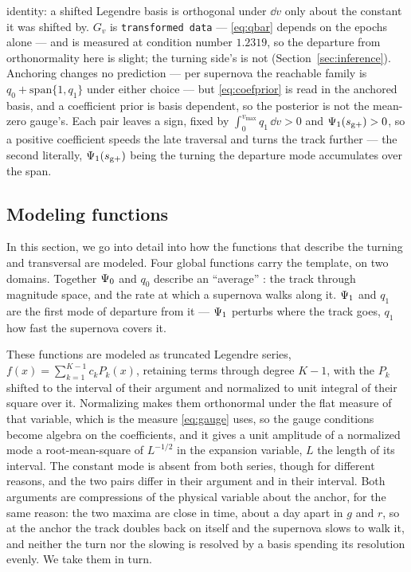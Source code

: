 \documentclass[11pt]{article}
\theoremstyle{plain}
\begin{document}
identity: a shifted Legendre basis is orthogonal under $\dd v$ only about the constant it
was shifted by. $G_{v}$ is \texttt{transformed data} --- \eqref{eq:qbar} depends on the
epochs alone --- and is measured at condition number $1.2319$, so the departure from
orthonormality here is slight; the turning side's is not (Section~\ref{sec:inference}). Anchoring changes no prediction --- per supernova the reachable family is
$q_{0} + \mathrm{span}\{1, q_{1}\}$ under either choice --- but \eqref{eq:coefprior} is read
in the anchored basis, and a coefficient prior is basis dependent, so the posterior is not
the mean-zero gauge's. Each pair leaves a sign, fixed by
$\int_{0}^{v_{\max}} q_{1}\,\dd v > 0$ and $\Psi_{1}(s_{\mathrm{g}+}) > 0$, so a positive
coefficient speeds the late traversal and turns the track further --- the second literally,
$\Psi_{1}(s_{\mathrm{g}+})$ being the turning the departure mode accumulates over the span.


\subsection{Modeling functions}
\label{sec:traversal}

In this section, we go into detail into how the functions that describe the turning and transversal
are modeled.
Four global functions carry the template, on two domains. Together $\Psi_{0}$ and $q_{0}$
describe an ``average''  \snia: the track through magnitude space, and the rate at which a
supernova walks along it. $\Psi_{1}$ and $q_{1}$ are the first mode of departure from it ---
$\Psi_{1}$ perturbs where the track goes,
$q_{1}$ how fast the supernova covers it.

These functions are modeled as truncated Legendre series,
$f(x) = \sum_{k=1}^{K-1} c_{k}P_{k}(x)$, retaining terms through degree $K-1$, with the
$P_{k}$ shifted to the interval of their argument and normalized to unit integral of their
square over it. Normalizing makes
them orthonormal under the flat measure of that variable, which is the measure
\eqref{eq:gauge} uses, so the gauge conditions become algebra on the coefficients, and it
gives a unit amplitude of a normalized mode a root-mean-square of $L^{-1/2}$ in the
expansion variable, $L$ the length of its interval. The
constant mode is absent from both series, though for different reasons, and the two pairs
differ in their argument and in their interval. Both arguments are compressions of the
physical variable about the anchor, for the same reason: the two maxima are close in time,
about a day apart in $g$ and $r$, so at the anchor the track doubles back on itself and
the supernova slows to walk it, and neither the turn nor the slowing is resolved by a basis
spending its resolution evenly. We take them in turn.
\end{document}
